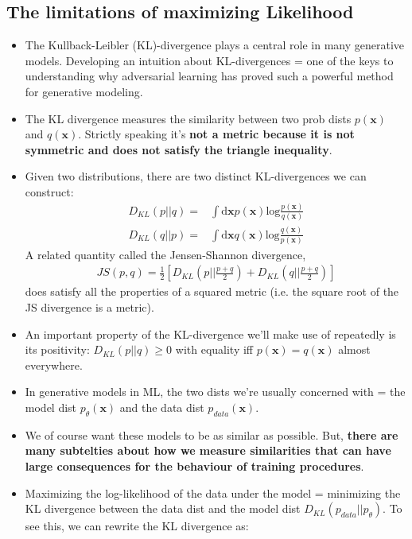 \documentclass[norsk,a4paper,11pt]{article}
\begin{document}
\subsection{The limitations of maximizing Likelihood}
\begin{itemize}
	\item The Kullback-Leibler (KL)-divergence plays a central role in many generative models. Developing an intuition about KL-divergences = one of the keys to understanding why adversarial learning has proved such a powerful method for generative modeling.
	\item The KL divergence measures the similarity between two prob dists $p(\bm{x})$ and $q(\bm{x})$. Strictly speaking it's \textbf{not a metric because it is not symmetric and does not satisfy the triangle inequality}.
	\item Given two distributions, there are two distinct KL-divergences we can construct:
	\begin{align}
		D_{KL} (p||q) =& \int \text{d} \bm{x} p(\bm{x}) \text{log} \frac{p(\bm{x})}{q(\bm{x})} \\
		D_{KL} (q||p) =& \int \text{d} \bm{x} q(\bm{x}) \text{log} \frac{q(\bm{x})}{p(\bm{x})}
	\end{align}
	A related quantity called the Jensen-Shannon divergence,
	\begin{align}
		JS(p, q) = \frac{1}{2} [D_{KL}(p|| \frac{p+q}{2}) + D_{KL}(q||\frac{p+q}{2})]
	\end{align}
	does satisfy all the properties of a squared metric (i.e. the square root of the JS divergence is a metric).
	\item An important property of the KL-divergence we'll make use of repeatedly is its positivity: $D_{KL} (p||q) \geq 0$ with equality iff $p(\bm{x}) = q(\bm{x})$ almost everywhere.
	\item In generative models in ML, the two dists we're usually concerned with = the model dist $p_\theta (\bm{x})$ and the data dist $p_{data} (\bm{x})$. 
	\item We of course want these models to be as similar as possible. But, \textbf{there are many subtelties about how we measure similarities that can have large consequences for the behaviour of training procedures}.
	\item Maximizing the log-likelihood of the data under the model = minimizing the KL divergence between the data dist and the model dist $D_{KL}(p_{data}|| p_\theta)$. To see this, we can rewrite the KL divergence as:
	\begin{align}

\end{align}
\end{itemize}
\end{document}
